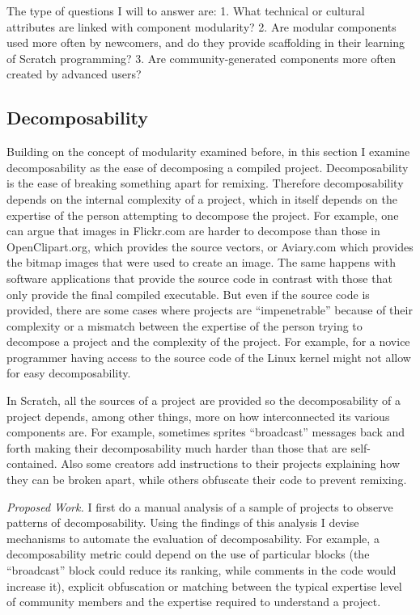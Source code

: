 The type of questions I will to answer are:
1. What technical or cultural attributes are linked with component modularity? 
2. Are modular components used more often by newcomers, and do they provide scaffolding in their learning of Scratch programming?
3. Are community-generated components more often created by advanced users?

\subsection{Decomposability}
Building on the concept of modularity examined before, in this section I examine decomposability as the ease of decomposing a compiled project.
Decomposability is the ease of breaking something apart for remixing.
Therefore decomposability depends on the internal complexity of a project, which in itself depends on the expertise of the person attempting to decompose the project.
For example, one can argue that images in Flickr.com are harder to decompose than those in OpenClipart.org, which provides the source vectors, or Aviary.com which provides the bitmap images that were used to create an image.
The same happens with software applications that provide the source code in contrast with those that only provide the final compiled executable.
But even if the source code is provided, there are some cases where projects are ``impenetrable'' because of their complexity or a mismatch between the expertise of the person trying to decompose a project and the complexity of the project. 
For example, for a novice programmer having access to the source code of the Linux kernel might not allow for easy decomposability.

In Scratch, all the sources of a project are provided so the decomposability of a project depends, among other things, more on how interconnected its various components are. 
For example, sometimes sprites ``broadcast'' messages back and forth making their decomposability much harder than those that are self-contained.
Also some creators add instructions to their projects explaining how they can be broken apart, while others obfuscate their code to prevent remixing.

\emph{Proposed Work.}
I first do a manual analysis of a sample of projects to observe patterns of decomposability. 
Using the findings of this analysis I devise mechanisms to automate the evaluation of decomposability. 
For example, a decomposability metric could depend on the use of particular blocks (the ``broadcast'' block could reduce its ranking, while comments in the code would increase it), explicit obfuscation or matching between the typical expertise level of community members and the expertise required to understand a project.

